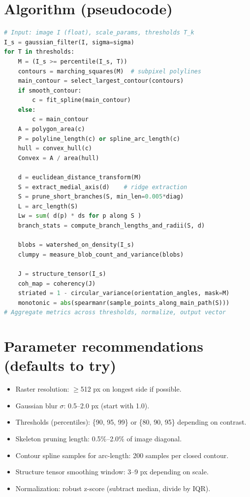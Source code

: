 \documentclass[11pt]{article}
\begin{document}
\section{Algorithm (pseudocode)}
\begin{lstlisting}[language=Python, basicstyle=\ttfamily\small]
# Input: image I (float), scale_params, thresholds T_k
I_s = gaussian_filter(I, sigma=sigma)
for T in thresholds:
    M = (I_s >= percentile(I_s, T))
    contours = marching_squares(M)  # subpixel polylines
    main_contour = select_largest_contour(contours)
    if smooth_contour:
        c = fit_spline(main_contour)
    else:
        c = main_contour
    A = polygon_area(c)
    P = polyline_length(c) or spline_arc_length(c)
    hull = convex_hull(c)
    Convex = A / area(hull)

    d = euclidean_distance_transform(M)
    S = extract_medial_axis(d)    # ridge extraction
    S = prune_short_branches(S, min_len=0.005*diag)
    L = arc_length(S)
    Lw = sum( d(p) * ds for p along S )
    branch_stats = compute_branch_lengths_and_radii(S, d)

    blobs = watershed_on_density(I_s)
    clumpy = measure_blob_count_and_variance(blobs)

    J = structure_tensor(I_s)
    coh_map = coherency(J)
    striated = 1 - circular_variance(orientation_angles, mask=M)
    monotonic = abs(spearmanr(sample_points_along_main_path(S)))
# Aggregate metrics across thresholds, normalize, output vector
\end{lstlisting}

\section{Parameter recommendations (defaults to try)}
\begin{itemize}
  \item Raster resolution: $\ge$512 px on longest side if possible.
  \item Gaussian blur $\sigma$: 0.5--2.0 px (start with 1.0).
  \item Thresholds (percentiles): \{90, 95, 99\} or \{80, 90, 95\} depending on contrast.
  \item Skeleton pruning length: 0.5\%--2.0\% of image diagonal.
  \item Contour spline samples for arc-length: 200 samples per closed contour.
  \item Structure tensor smoothing window: 3--9 px depending on scale.
  \item Normalization: robust z-score (subtract median, divide by IQR).
\end{itemize}
\end{document}
